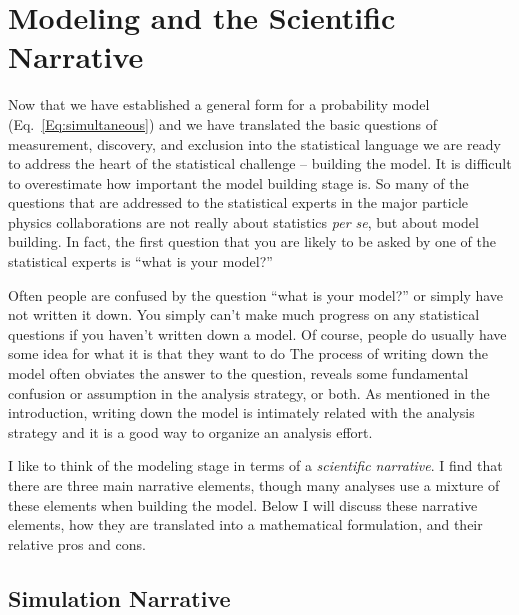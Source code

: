 \section{Modeling and the Scientific Narrative}


Now that we have established a general form for a probability model (Eq.~\ref{Eq:simultaneous}) and we have translated the basic questions of measurement, discovery, and exclusion into the statistical language we are ready to address the heart of the statistical challenge -- building the model.  It is difficult to overestimate how important the model building stage is.  So many of the questions that are addressed to the statistical experts in the major particle physics collaborations are not really about statistics \textit{per se}, but about model building.  In fact, the first question that you are likely to be asked by one of the statistical experts is ``what is your model?'' 


Often people are confused by the question ``what is your model?'' or simply have not written it down.  You simply can't make much progress on any statistical questions if you haven't written down a model.  Of course, people do usually have some idea for what it is that they want to do The process of writing down the model often obviates the answer to the question, reveals some fundamental confusion or assumption in the analysis strategy, or both.  As mentioned in the introduction, writing down the model is intimately related with the analysis strategy and it is a good way to organize an analysis effort.


I like to think of the modeling stage in terms of a  \textit{scientific narrative}.  I find that there are three main narrative elements, though many analyses use a mixture of these elements when building the model.  Below I will discuss these narrative elements, how they are translated into a mathematical formulation, and their relative pros and cons.


\subsection{Simulation Narrative}


